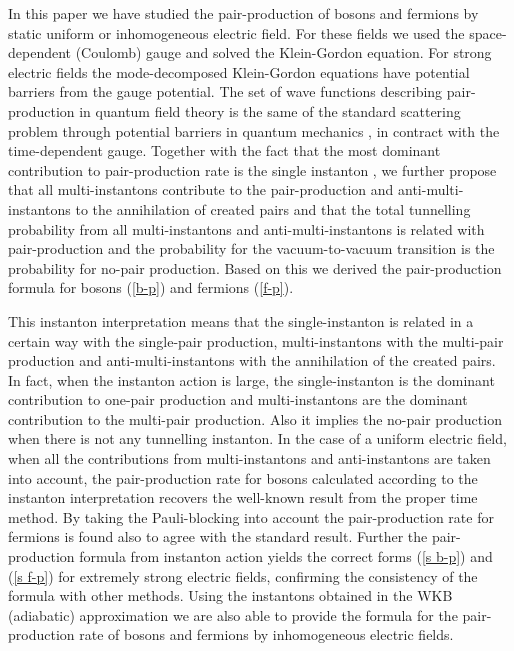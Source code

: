 \documentclass[a4paper,prd,showpacs,preprintnumbers,amsmath,amssymb]{revtex4}
\begin{document}
In this paper we have studied the pair-production of bosons and
fermions by static uniform or inhomogeneous electric field. For
these fields we used the space-dependent (Coulomb) gauge and
solved the Klein-Gordon equation. For strong electric fields the
mode-decomposed Klein-Gordon equations have potential barriers
from the gauge potential. The set of wave functions describing
pair-production in quantum field theory is the same of the
standard scattering problem through potential barriers in quantum
mechanics \cite{pad,pad2,han}, in contract with the time-dependent
gauge. Together with the fact that the most dominant contribution
to pair-production rate is the single instanton
\cite{bre,itz,neu,neu2,neu3}, we further propose that all
multi-instantons contribute to the pair-production and
anti-multi-instantons to the annihilation of created pairs and
that the total tunnelling probability from all multi-instantons
and anti-multi-instantons is related with pair-production and the
probability for the vacuum-to-vacuum transition is the probability
for no-pair production. Based on this we derived the
pair-production formula for bosons (\ref{b-p}) and fermions
(\ref{f-p}).





This instanton interpretation means that the single-instanton is
related in a certain way with the single-pair production,
multi-instantons with the multi-pair production and
anti-multi-instantons with the annihilation of the created pairs.
In fact, when the instanton action is large, the single-instanton
is the dominant contribution to one-pair production and
multi-instantons are the dominant contribution to the multi-pair
production. Also it implies the no-pair production when there is
not any tunnelling instanton. In the case of a uniform electric
field, when all the contributions from multi-instantons and
anti-instantons are taken into account, the pair-production rate
for bosons calculated according to the instanton interpretation
recovers the well-known result from the proper time method. By
taking the Pauli-blocking into account the pair-production rate
for fermions is found also to agree with the standard result.
Further the pair-production formula from instanton action yields
the correct forms (\ref{s b-p}) and (\ref{s f-p}) for extremely
strong electric fields, confirming the consistency of the formula
with other methods. Using the instantons obtained in the WKB
(adiabatic) approximation we are also able to provide the formula
for the pair-production rate of bosons and fermions by
inhomogeneous electric fields.
\end{document}
